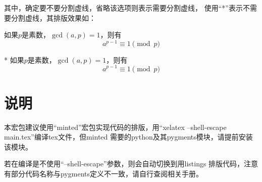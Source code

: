 \documentclass{ctexart}
\newcommand{\qtmark}[1]{``#1''}
\begin{document}
其中，确定要不要分割虚线，省略该选项则表示需要分割虚线，
使用\qtmark{*}表示不需要分割虚线，其排版效果如：

\begin{texdemov}
  如果$p$是素数，$\gcd(a,p)=1$，则有
$$a^{p-1} \equiv 1 \pmod{p}$$
\end{texdemov}

\begin{texdemov}*
如果$p$是素数，$\gcd(a,p)=1$，则有
$$a^{p-1} \equiv 1 \pmod{p}$$
\end{texdemov}

\section{说明}
本宏包建议使用\qtmark{minted}宏包实现代码的排版，用\qtmark{xelatex
  --shell-escape main.tex}编译tex文件，但minted
需要的python及其pygments模块，请提前安装该模块。

若在编译是不使用\qtmark{--shell-escape}参数，则会自动切换到用listings
排版代码，注意有部分代码名称与pygments定义不一致，请自行查阅相关手册。
\end{document}
